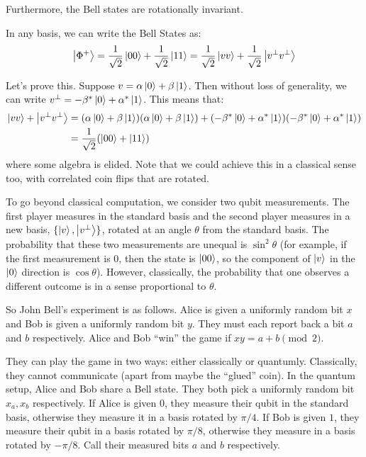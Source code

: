 Furthermore, the Bell states are rotationally invariant. 
\begin{theorem}
    In any basis, we can write the Bell States as:
    \[ \ket{\Phi^+} = \frac{1}{\sqrt{2}} \ket{00} + \frac{1}{\sqrt{2}} \ket{11} = \frac{1}{\sqrt{2}} \ket{vv} + \frac{1}{\sqrt{2}} \ket{v^{\perp} v^{\perp}} \]
\end{theorem}

Let's prove this. Suppose $v = \alpha \ket{0} + \beta \ket{1}$. Then without loss of generality, we can write $v^{\perp} = -\beta^* \ket{0} + \alpha^* \ket{1}$.
This means that:
\begin{align*}
    \ket{vv} + \ket{v^{\perp} v^{\perp}} &= \qty(\alpha \ket{0} + \beta \ket{1})\qty(\alpha \ket{0} + \beta \ket{1}) + \qty(-\beta^* \ket{0} + \alpha^* \ket{1}) \qty(-\beta^* \ket{0} + \alpha^* \ket{1}) \\
    &=  \frac{1}{\sqrt{2}} \qty(\ket{00} + \ket{11})
\end{align*}
where some algebra is elided. Note that we could achieve this
in a classical sense too, with correlated coin flips that are rotated.

To go beyond classical computation, we consider two qubit measurements.
The first player measures in the standard basis and the second player measures in a new basis, $\{ \ket{v}, \ket{v^{\perp}} \}$, rotated at an angle $\theta$ from the standard basis.
The probability that these two measurements are unequal is $\sin^2 \theta$ (for example, if the first measurement is $0$, then the state is $\ket{00}$, so the component of $\ket{v}$ in the $\ket{0}$ direction is $\cos \theta$).
However, classically, the probability that one observes a different outcome is in a sense proportional to $\theta$.

So John Bell's experiment is as follows. Alice is given a uniformly random bit $x$ and Bob is given a uniformly random bit $y$. They must each report back
a bit $a$ and $b$ respectively.
Alice and Bob ``win'' the game if $xy = a + b \pmod{2}$.

They can play the game in two ways: either classically or quantumly. Classically, they cannot communicate (apart from maybe the ``glued'' coin).
In the quantum setup, 
Alice and Bob share a Bell state. They both pick a uniformly random bit $x_a, x_b$ respectively.
If Alice is given $0$, they measure their qubit in the standard basis, otherwise they measure it in a basis rotated by $\pi/4$. If Bob
is given $1$, they measure their qubit in a basis rotated by $\pi/8$, otherwise they measure in a basis rotated by $-\pi/8$. Call their measured
bits $a$ and $b$ respectively.

